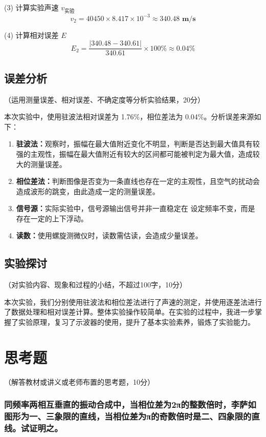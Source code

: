 \documentclass[10pt,a4paper]{ctexart}
\newcommand{\myspace}[1]{\par\vspace{#1\baselineskip}} %
\newcommand{\xiaosi}{\fontsize{12pt}{16pt}\selectfont}
\begin{document}
(3) 计算实验声速 $v_{\text{实验}}$$$v_2 = 40450 \times 8.417 \times 10^{-3} \approx \mathbf{340.48 \text{ m/s}}$$

(4) 计算相对误差 $E$$$E_2 = \frac{|340.48 - 340.61|}{340.61} \times 100\% \approx \mathbf{0.04\%}$$





    \subsection{误差分析}
    \xiaosi （运用测量误差、相对误差、不确定度等分析实验结果，20分）

    本次实验中，使用驻波法相对误差为 1.76\%，相位差法为 0.04\%。分析误差来源如下：
    
    \begin{enumerate}
        \item \textbf{驻波法：}观察时，振幅在最大值附近变化不明显，判断是否达到最大值具有较强的主观性，振幅在最大值附近有较大的区间都可能被判定为最大值，造成较大的测量误差。
        \item \textbf{相位差法：}判断图像是否变为一条直线也存在一定的主观性，且空气的扰动会造成波形的跳变，由此造成一定的测量误差。
        \item \textbf{信号源：}实际实验中，信号源输出信号并非一直稳定在 设定频率不变，而是存在一定的上下浮动。
        \item \textbf{读数：}使用螺旋测微仪时，读数需估读，会造成少量误差。
    \end{enumerate}   
    
    \subsection{实验探讨}
    \xiaosi （对实验内容、现象和过程的小结，不超过100字，10分）

    \myspace{1}

    本次实验，我们分别使用驻波法和相位差法进行了声速的测定，并使用逐差法进行了数据处理和相对误差计算。整体实验操作较简单。在实验的过程中，我进一步掌握了实验原理，复习了示波器的使用，提升了基本实验素养，锻炼了实验能力。

    \section{思考题}

    \xiaosi （解答教材或讲义或老师布置的思考题，10分）

    \subsubsection*{同频率两相互垂直的振动合成中，当相位差为2π的整数倍时，李萨如图形为一、三象限的直线，当相位差为π的奇数倍时是二、四象限的直线。试证明之。}
\end{document}
